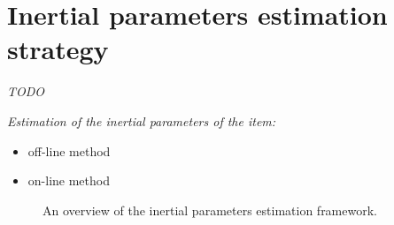 \documentclass[/home/francois/latex/report/main.tex]{subfiles}
\begin{document}
\section{Inertial parameters estimation strategy}

\textit{TODO}

{\it
Estimation of the inertial parameters of the item:

\begin{itemize}
  \item off-line method
  \item on-line method
\end{itemize}
}

\begin{figure}[H]
\centering
   \caption{An overview of the inertial parameters estimation framework.}
   \label{fig:tikz:model}
\end{figure}
\end{document}
